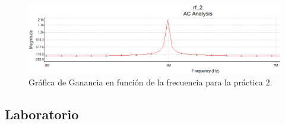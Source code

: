 \documentclass[11pt,graphicx,caption,rotating]{article}
\begin{document}
\begin{figure}[H]
	\centering
		\includegraphics[scale=0.45]{simulation_lab_2.png}
	\caption{Gráfica de Ganancia en función de la frecuencia para la práctica $2$.}
	\label{fig10}
\end{figure}

\subsection{Laboratorio}
\noindent
\end{document}
